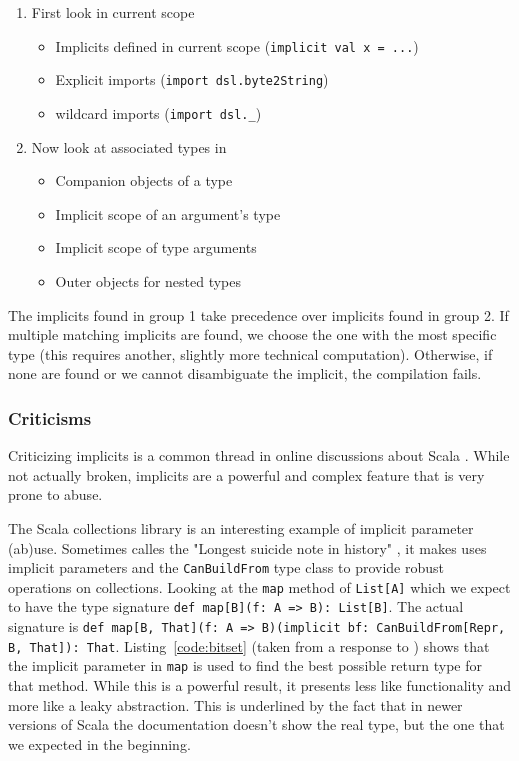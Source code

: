 \begin{enumerate}
	\item First look in current scope
	\begin{itemize}
		\item Implicits defined in current scope (\texttt{implicit val x = ...})
    \item Explicit imports (\texttt{import dsl.byte2String})
    \item wildcard imports (\texttt{import dsl.\_})
	\end{itemize}
	\item Now look at associated types in
	\begin{itemize}
		\item Companion objects of a type
		\item Implicit scope of an argument’s type
		\item Implicit scope of type arguments
		\item Outer objects for nested types
	\end{itemize}
\end{enumerate}

The implicits found in group 1 take precedence over implicits found in group 2. If multiple matching implicits are found, we choose the one with the most specific type (this requires another, slightly more technical computation). Otherwise, if none are found or we cannot disambiguate the implicit, the compilation fails.

\subsubsection{Criticisms}

Criticizing implicits is a common thread in online discussions about Scala \autocite{Plush:2015, lakes:2009, Allan:2013, Hale:2011}. While not actually broken, implicits are a powerful and complex feature that is very prone to abuse.

The Scala collections library is an interesting example of implicit parameter (ab)use. Sometimes calles the "Longest suicide note in history" \autocite{lakes:2009}, it makes uses implicit parameters and the \texttt{CanBuildFrom} type class to provide robust operations on collections. Looking at the \texttt{map} method of \texttt{List[A]} which we expect to have the type signature \texttt{def map[B](f: A => B): List[B]}. The actual signature is \texttt{def map[B, That](f: A => B)(implicit bf: CanBuildFrom[Repr, B, That]): That}. Listing~\ref{code:bitset} (taken from a response to \autocite{lakes:2009}) shows that the implicit parameter in \texttt{map} is used to find the best possible return type for that method. While this is a powerful result, it presents less like functionality and more like a leaky abstraction. This is underlined by the fact that in newer versions of Scala the documentation doesn't show the real type, but the one that we expected in the beginning.


